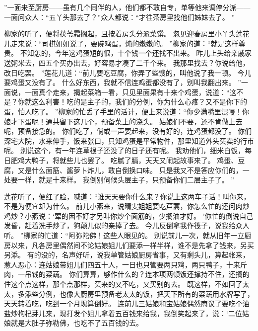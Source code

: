 ”一面来至厨房——虽有几个同伴的人，他们都不敢自专，单等他来调停分派——一面问众人：“五丫头那去了？”众人都说：“才往茶房里找他们姊妹去了。
”\par
柳家的听了，便将茯苓霜搁起，且按着房头分派菜馔。
忽见迎春房里小丫头莲花儿走来说：“司棋姐姐说了，要碗鸡蛋，炖的嫩嫩的。
”柳家的道：“就是这样尊贵。
不知怎的，今年这鸡蛋短的很，十个钱一个还找不出来。
昨儿上头给亲戚家送粥米去，四五个买办出去，好容易才凑了二千个来。
我那里找去？你说给他，改日吃罢。
”莲花儿道：“前儿要吃豆腐，你弄了些馊的，叫他说了我一顿。
今儿要鸡蛋又没有了。
什么好东西，我就不信连鸡蛋都没有了，别叫我翻出来。
”一面说，一面真个走来，揭起菜箱一看，只见里面果有十来个鸡蛋，说道：“这不是？你就这么利害！吃的是主子的，我们的分例，你为什么心疼？又不是你下的蛋，怕人吃了。
”柳家的忙丢了手里的活计，便上来说道：“你少满嘴里混唚！你娘才下蛋呢！通共留下这几个，预备菜上的浇头。
姑娘们不要，还不肯做上去呢，预备接急的。
你们吃了，倘或一声要起来，没有好的，连鸡蛋都没了。
你们深宅大院，水来伸手，饭来张口，只知鸡蛋是平常物件，那里知道外头买卖的行市呢。
别说这个，有一年连草根子还没了的日子还有呢。
我劝他们，细米白饭，每日肥鸡大鸭子，将就些儿也罢了。
吃腻了膈，天天又闹起故事来了。
鸡蛋、豆腐，又是什么面筋、酱萝卜炸儿，敢自倒换口味。
只是我又不是答应你们的，一处要一样，就是十来样。
我倒别伺候头层主子，只预备你们二层主子了。
”\par
莲花听了，便红了脸，喊道：“谁天天要你什么来？你说上这两车子话！叫你来，不是为便宜却为什么。
前儿小燕来，说晴雯姐姐要吃芦蒿，你怎么忙的还问肉炒鸡炒？小燕说：‘荤的因不好才另叫你炒个面筋的，少搁油才好。
’你忙的倒说自己发昏，赶着洗手炒了，狗颠儿似的亲捧了去。
今儿反倒拿我作筏子，说我给众人听。
”柳家的忙道：“阿弥陀佛！这些人眼见的。
别说前儿一次，就从旧年一立厨房以来，凡各房里偶然间不论姑娘姐儿们要添一样半样，谁不是先拿了钱来，另买另添。
有的没的，名声好听，说我单管姑娘厨房省事，又有剩头儿，算起帐来，惹人恶心：连姑娘带姐儿们四五十人，一日也只管要两只鸡，两只鸭子，十来斤肉，一吊钱的菜蔬。
你们算算，够作什么的？连本项两顿饭还撑持不住，还搁的住这个点这样，那个点那样，买来的又不吃，又买别的去。
既这样，不如回了太太，多添些分例，也像大厨房里预备老太太的饭，把天下所有的菜蔬用水牌写了，天天转着吃，吃到一个月现算倒好。
连前儿三姑娘和宝姑娘偶然商议了要吃个油盐炒枸杞芽儿来，现打发个姐儿拿着五百钱来给我，我倒笑起来了，说：‘二位姑娘就是大肚子弥勒佛，也吃不了五百钱的去。
